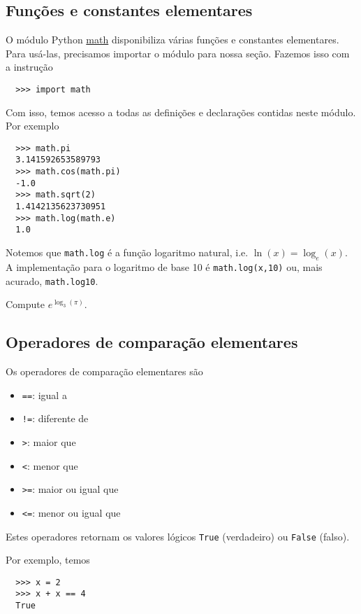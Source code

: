 \documentclass[12pt]{article}
\begin{document}
\subsection{Funções e constantes elementares}

O módulo Python \href{https://docs.python.org/3/library/math.html}{math} disponibiliza várias funções e constantes elementares. Para usá-las, precisamos importar o módulo para nossa seção. Fazemos isso com a instrução
\begin{lstlisting}
  >>> import math
\end{lstlisting}
Com isso, temos acesso a todas as definições e declarações contidas neste módulo. Por exemplo
\begin{lstlisting}
  >>> math.pi
  3.141592653589793
  >>> math.cos(math.pi)
  -1.0
  >>> math.sqrt(2)
  1.4142135623730951
  >>> math.log(math.e)
  1.0
\end{lstlisting}

\begin{obs}
  Notemos que \lstinline+math.log+ é a função logaritmo natural, i.e. $\ln(x) = \log_e(x)$. A implementação {\python} para o logaritmo de base 10 é \lstinline+math.log(x,10)+ ou, mais acurado, \lstinline+math.log10+.
\end{obs}

\begin{exr}
  Compute $e^{\log_3(\pi)}$.
\end{exr}

\subsection{Operadores de comparação elementares}

Os operadores de comparação elementares são
\begin{itemize}
\item[]\lstinline+==+: igual a
\item[]\lstinline+!=+: diferente de
\item[]\lstinline+>+: maior que
\item[]\lstinline+<+: menor que
\item[]\lstinline+>=+: maior ou igual que
\item[]\lstinline+<=+: menor ou igual que
\end{itemize}
Estes operadores retornam os valores lógicos \lstinline+True+ (verdadeiro) ou \lstinline+False+ (falso).

Por exemplo, temos
\begin{lstlisting}
  >>> x = 2
  >>> x + x == 4
  True
\end{lstlisting}
\end{document}

